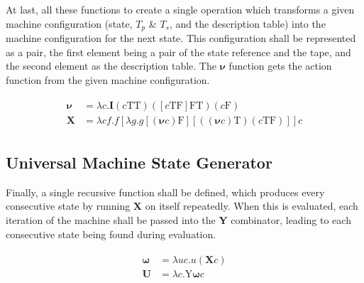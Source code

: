 \documentclass[Master.tex]{subfiles}
\begin{document}
At last, all these functions to create a single operation which transforms a given machine configuration (state, $T_p$ \& $T_s$, and the description table) into the machine configuration for the next state. This configuration shall be represented as a pair, the first element being a pair of the state reference and the tape, and the second element as the description table. The $\bm{\nu}$ function gets the action function from the given machine configuration.

\begin{gather*}
\begin{aligned}
\bm{\nu} &= \lambda c.\bm{I}(c\bm{\mathrm{TT}})([c\bm{\mathrm{TF}}]\bm{\mathrm{FT}})(c\bm{\mathrm{F}})\\
\bm{X} &= \lambda cf.f[\lambda g.g[(\bm{\nu}c)\bm{\mathrm{F}}][((\bm{\nu}c)\bm{\mathrm{T}})(c\bm{\mathrm{TF}})]]c
\end{aligned}
\end{gather*}

\subsection{Universal Machine State Generator}

Finally, a single recursive function shall be defined, which produces every consecutive state by running $\bm{X}$ on itself repeatedly. When this is evaluated, each iteration of the machine shall be passed into the \textbf{Y} combinator, leading to each consecutive state being found during evaluation.

\begin{gather*}
\begin{aligned}
\bm{\omega} &= \lambda uc.u(\bm{X}c) \\
\bm{U} &= \lambda c.\bm{\mathrm{Y}}\bm{\omega}c
\end{aligned}
\end{gather*}

\end{document}
